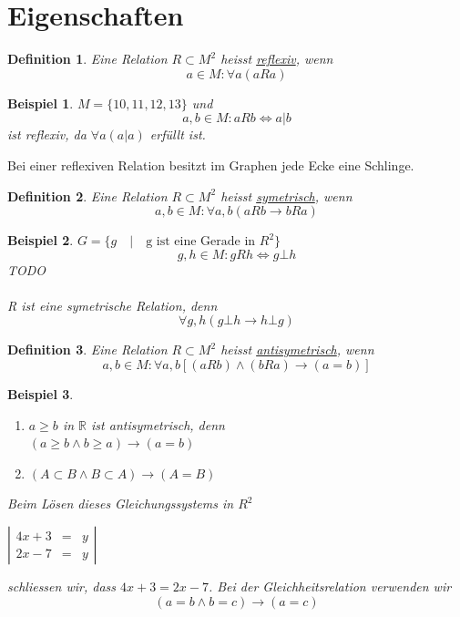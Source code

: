 \documentclass{report}
\newtheorem{mydef}{Definition}
\newtheorem{myexample}{Beispiel}
\begin{document}
\section{Eigenschaften}
\begin{mydef}Eine Relation $R \subset M^2$ heisst \underline{reflexiv}, wenn
\begin{equation}a \in M: \forall a ( a R a)\end{equation}\end{mydef}
\begin{myexample}$M = \{10, 11, 12, 13\}$ und
\begin{equation}a,b \in M: a R b \iff a | b\end{equation}
ist reflexiv, da $\forall a ( a | a)$ erfüllt ist.\end{myexample}
Bei einer reflexiven Relation besitzt im Graphen jede Ecke eine Schlinge.
\begin{mydef}Eine Relation $R \subset M^2$ heisst \underline{symetrisch}, wenn
\begin{equation}a,b \in M: \forall a,b ( a R b \to b R a)\end{equation}\end{mydef}
\begin{myexample}$G = \{g \quad | \quad \mbox{g ist eine Gerade in } R^2\}$
\begin{equation}g, h \in M: g R h \iff g \bot h\end{equation}
TODO\\\\
R ist eine symetrische Relation, denn
\begin{equation}\forall g,h ( g \bot h \to h \bot g)\end{equation}\end{myexample}
\begin{mydef}Eine Relation $R \subset M^2$ heisst \underline{antisymetrisch}, wenn
\begin{equation}a,b \in M: \forall a,b [(a R b) \land (b R a) \to (a = b)]\end{equation}\end{mydef}
\begin{myexample}\begin{enumerate}\item $a \geq b$ in $\mathbb{R}$ ist antisymetrisch, denn\\
$(a \geq b \land b \geq a) \to (a = b)$
\item $(A \subset B \land B \subset A) \to (A = B)$\end{enumerate}
\item Beim Lösen dieses Gleichungssystems in $R^2$
\begin{center}$\left|\begin{array}{rcr}
4x + 3 & = & y\\
2x - 7 & = & y\end{array}\right|$\end{center}
schliessen wir, dass $4x + 3 = 2x - 7$. Bei der Gleichheitsrelation verwenden wir
\begin{equation}(a = b \land b = c) \to (a = c)\end{equation}\end{myexample}
\end{document}
